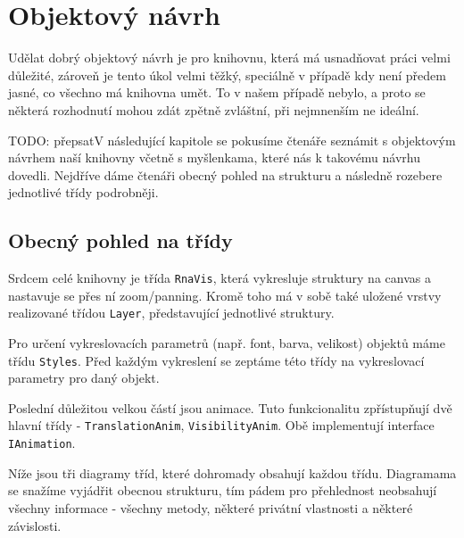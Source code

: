 \section{Objektový návrh}

Udělat dobrý objektový návrh je pro knihovnu, která má usnadňovat práci velmi
důležité, zároveň je tento úkol velmi těžký, speciálně v případě kdy není
předem jasné, co všechno má knihovna umět. To v našem případě nebylo, a proto
se některá rozhodnutí mohou zdát zpětně zvláštní, při nejmnenším ne ideální.

{\color{red}TODO: přepsat}V následující kapitole se pokusíme čtenáře seznámit s
objektovým návrhem naší knihovny včetně s myšlenkama, které nás k takovému
návrhu dovedli. Nejdříve dáme čtenáři obecný pohled na strukturu a následně
rozebere jednotlivé třídy podrobněji.

\subsection{Obecný pohled na třídy}

Srdcem celé knihovny je třída \texttt{RnaVis}, která vykresluje struktury na
canvas a nastavuje se přes ní zoom/panning. Kromě toho má v sobě také uložené
vrstvy realizované třídou \texttt{Layer}, představující jednotlivé struktury.

Pro určení vykreslovacích parametrů (např. font, barva, velikost) objektů  máme
třídu \texttt{Styles}. Před každým vykreslení se zeptáme této třídy na
vykreslovací parametry pro daný objekt.

Poslední důležitou velkou částí jsou animace. Tuto funkcionalitu zpřístupňují
dvě hlavní třídy - \texttt{TranslationAnim}, \texttt{VisibilityAnim}. Obě
implementují interface \texttt{IAnimation}. 

Níže jsou tři diagramy tříd, které dohromady obsahují každou třídu. Diagramama
se snažíme vyjádřit obecnou strukturu, tím pádem pro přehlednost neobsahují
všechny informace - všechny metody, některé privátní vlastnosti a některé
závislosti.
 
